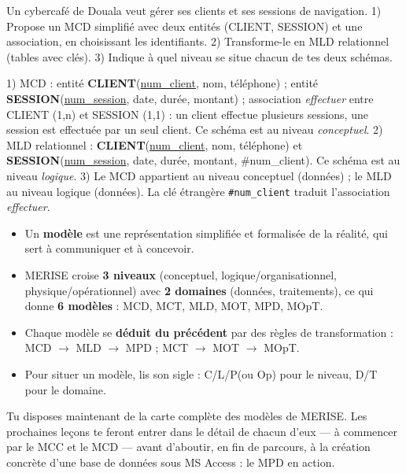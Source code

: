 \documentclass[11pt]{article}
\begin{document}
\begin{exercice}
Un cybercafé de Douala veut gérer ses clients et ses sessions de navigation. 1) Propose un MCD simplifié avec deux entités (CLIENT, SESSION) et une association, en choisissant les identifiants. 2) Transforme-le en MLD relationnel (tables avec clés). 3) Indique à quel niveau se situe chacun de tes deux schémas.
\end{exercice}

\begin{corrige}[Exercice 1]
1) MCD : entité \textbf{CLIENT}(\underline{num\_client}, nom, téléphone) ; entité \textbf{SESSION}(\underline{num\_session}, date, durée, montant) ; association \emph{effectuer} entre CLIENT (1,n) et SESSION (1,1) : un client effectue plusieurs sessions, une session est effectuée par un seul client. Ce schéma est au niveau \emph{conceptuel}.
2) MLD relationnel : \textbf{CLIENT}(\underline{num\_client}, nom, téléphone) et \textbf{SESSION}(\underline{num\_session}, date, durée, montant, \#num\_client). Ce schéma est au niveau \emph{logique}.
3) Le MCD appartient au niveau conceptuel (données) ; le MLD au niveau logique (données). La clé étrangère \texttt{\#num\_client} traduit l'association \emph{effectuer}.
\end{corrige}

\begin{aretenir}
\begin{itemize}
\item Un \textbf{modèle} est une représentation simplifiée et formalisée de la réalité, qui sert à communiquer et à concevoir.
\item MERISE croise \textbf{3 niveaux} (conceptuel, logique/organisationnel, physique/opérationnel) avec \textbf{2 domaines} (données, traitements), ce qui donne \textbf{6 modèles} : MCD, MCT, MLD, MOT, MPD, MOpT.
\item Chaque modèle se \textbf{déduit du précédent} par des règles de transformation : MCD $\rightarrow$ MLD $\rightarrow$ MPD ; MCT $\rightarrow$ MOT $\rightarrow$ MOpT.
\item Pour situer un modèle, lis son sigle : C/L/P(ou Op) pour le niveau, D/T pour le domaine.
\end{itemize}
\end{aretenir}

Tu disposes maintenant de la carte complète des modèles de MERISE. Les prochaines leçons te feront entrer dans le détail de chacun d'eux — à commencer par le MCC et le MCD — avant d'aboutir, en fin de parcours, à la création concrète d'une base de données sous MS Access : le MPD en action.
\end{document}
